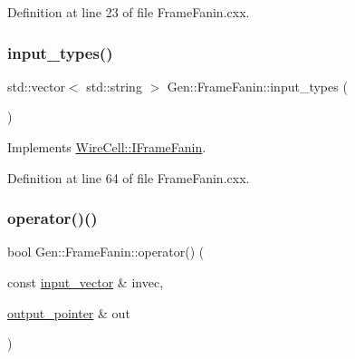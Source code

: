 Definition at line 23 of file Frame\+Fanin.\+cxx.

\mbox{\label{class_wire_cell_1_1_gen_1_1_frame_fanin_aeba173a6fd84de2b655fe56fd41d8c05}} 
\subsubsection{\texorpdfstring{input\+\_\+types()}{input\_types()}}
{\footnotesize\ttfamily std\+::vector$<$ std\+::string $>$ Gen\+::\+Frame\+Fanin\+::input\+\_\+types (\begin{DoxyParamCaption}{ }\end{DoxyParamCaption})\hspace{0.3cm}{\ttfamily [virtual]}}



Implements \hyperlink{class_wire_cell_1_1_i_frame_fanin_a7c19800cac1dc1bf67199b067811f500}{Wire\+Cell\+::\+I\+Frame\+Fanin}.



Definition at line 64 of file Frame\+Fanin.\+cxx.

\mbox{\label{class_wire_cell_1_1_gen_1_1_frame_fanin_a07a4dc2a3d5126a5540613534c73b914}} 
\subsubsection{\texorpdfstring{operator()()}{operator()()}}
{\footnotesize\ttfamily bool Gen\+::\+Frame\+Fanin\+::operator() (\begin{DoxyParamCaption}\item[{const \hyperlink{class_wire_cell_1_1_i_fanin_node_aec26233b8b7756c5a42280a5db47ffda}{input\+\_\+vector} \&}]{invec,  }\item[{\hyperlink{class_wire_cell_1_1_i_fanin_node_a748d9cd1916dda1cb12c3376b229f906}{output\+\_\+pointer} \&}]{out }\end{DoxyParamCaption})\hspace{0.3cm}{\ttfamily [virtual]}}



